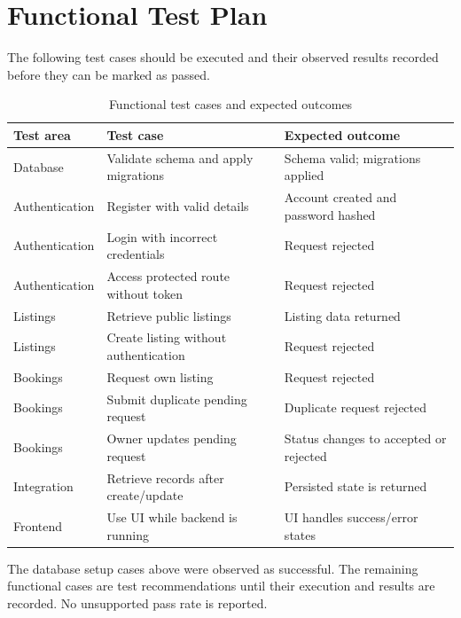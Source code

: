 \documentclass{tietreport}
\begin{document}
\section{Functional Test Plan}
The following test cases should be executed and their observed results recorded before they can be marked as passed.

\begin{table}[H]
\centering
\caption{Functional test cases and expected outcomes}
\small
\begin{tabular}{p{} p{} p{}}
\toprule
\textbf{Test area} & \textbf{Test case} & \textbf{Expected outcome}\\
\midrule
Database & Validate schema and apply migrations & Schema valid; migrations applied\\
Authentication & Register with valid details & Account created and password hashed\\
Authentication & Login with incorrect credentials & Request rejected\\
Authentication & Access protected route without token & Request rejected\\
Listings & Retrieve public listings & Listing data returned\\
Listings & Create listing without authentication & Request rejected\\
Bookings & Request own listing & Request rejected\\
Bookings & Submit duplicate pending request & Duplicate request rejected\\
Bookings & Owner updates pending request & Status changes to accepted or rejected\\
Integration & Retrieve records after create/update & Persisted state is returned\\
Frontend & Use UI while backend is running & UI handles success/error states\\
\bottomrule
\end{tabular}
\end{table}

The database setup cases above were observed as successful. The remaining functional cases are test recommendations until their execution and results are recorded. No unsupported pass rate is reported.
\end{document}
